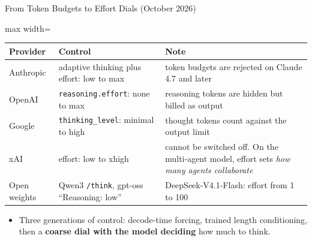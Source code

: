 \begin{frame}{From Token Budgets to Effort Dials (October 2026)}
    \begin{center}
    \small
    \renewcommand{\arraystretch}{1.15}
    \begin{adjustbox}{max width=\linewidth}\begin{tabular}{>{\raggedright\arraybackslash}p{2.3cm}>{\raggedright\arraybackslash}p{5.3cm}>{\raggedright\arraybackslash}p{6.2cm}}
        \toprule
        \textbf{Provider} & \textbf{Control} & \textbf{Note} \\
        \midrule
        Anthropic & adaptive thinking plus effort: low to max & token budgets are rejected on Claude 4.7 and later \\
        OpenAI & \texttt{reasoning.effort}: none to max & reasoning tokens are hidden but billed as output \\
        Google & \texttt{thinking\_level}: minimal to high & thought tokens count against the output limit \\
        xAI & effort: low to xhigh & cannot be switched off. On the multi-agent model, effort sets \emph{how many agents collaborate} \\
        Open weights & Qwen3 \texttt{/think}, gpt-oss ``Reasoning: low'' & DeepSeek-V4.1-Flash: effort from 1 to 100 \\
        \bottomrule
    \end{tabular}\end{adjustbox}
    \end{center}
    \begin{itemize}\itemsep0.3em
        \item Three generations of control: decode-time forcing, trained length conditioning, then a \textbf{coarse dial with the model deciding} how much to think.
    \end{itemize}
\end{frame}

